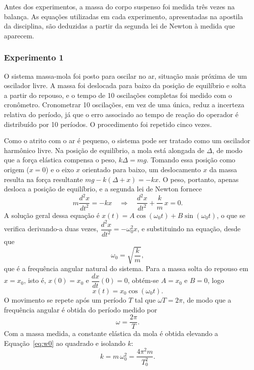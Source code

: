 Antes dos experimentos, a massa do corpo suspenso foi medida três vezes na balança. As equações utilizadas em cada experimento, apresentadas na apostila da disciplina, são deduzidas a partir da segunda lei de Newton à medida que aparecem.

\subsubsection{Experimento 1}

O sistema massa-mola foi posto para oscilar no ar, situação mais próxima de um oscilador livre. A massa foi deslocada para baixo da posição de equilíbrio e solta a partir do repouso, e o tempo de 10 oscilações completas foi medido com o cronômetro. Cronometrar 10 oscilações, em vez de uma única, reduz a incerteza relativa do período, já que o erro associado ao tempo de reação do operador é distribuído por 10 períodos. O procedimento foi repetido cinco vezes.

Como o atrito com o ar é pequeno, o sistema pode ser tratado como um oscilador harmônico livre. Na posição de equilíbrio, a mola está alongada de $\Delta$, de modo que a força elástica compensa o peso, $k\Delta=mg$. Tomando essa posição como origem ($x=0$) e o eixo $x$ orientado para baixo, um deslocamento $x$ da massa resulta na força resultante $mg-k(\Delta+x)=-kx$. O peso, portanto, apenas desloca a posição de equilíbrio, e a segunda lei de Newton fornece
\[
m\frac{d^2x}{dt^2}=-kx
\quad\Longrightarrow\quad
\frac{d^2x}{dt^2}+\frac{k}{m}\,x=0.
\]
A solução geral dessa equação é $x(t)=A\cos(\omega_0 t)+B\sin(\omega_0 t)$, o que se verifica derivando-a duas vezes, $\dfrac{d^2x}{dt^2}=-\omega_0^2x$, e substituindo na equação, desde que
\begin{equation}
\omega_0=\sqrt{\frac{k}{m}},
\label{eq:w0}
\end{equation}
que é a frequência angular natural do sistema. Para a massa solta do repouso em $x=x_0$, isto é, $x(0)=x_0$ e $\dfrac{dx}{dt}(0)=0$, obtém-se $A=x_0$ e $B=0$, logo
\[
x(t)=x_0\cos(\omega_0 t).
\]
O movimento se repete após um período $T$ tal que $\omega T=2\pi$, de modo que a frequência angular é obtida do período medido por
\begin{equation}
\omega=\frac{2\pi}{T}.
\label{eq:wT}
\end{equation}
Com a massa medida, a constante elástica da mola é obtida elevando a Equação~\eqref{eq:w0} ao quadrado e isolando $k$:
\begin{equation}
k=m\,\omega_0^2=\frac{4\pi^2m}{T_0^2}.
\label{eq:k}
\end{equation}


